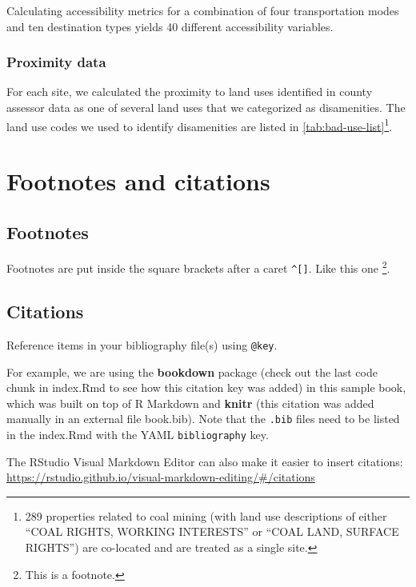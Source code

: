 \documentclass[
]{book}
\theoremstyle{definition}
\theoremstyle{definition}
\theoremstyle{definition}
\theoremstyle{definition}
\theoremstyle{remark}
\begin{document}
Calculating accessibility metrics for a combination of four transportation
modes and ten destination types yields 40 different accessibility variables.

\hypertarget{proximity-data}{%
\subsection{Proximity data}\label{proximity-data}}

For each site, we calculated the proximity to land uses identified in county
assessor data as one of several land uses that we categorized as
disamenities. The land use codes we used to identify disamenities are
listed in \ref{tab:bad-use-list}\footnote{289 properties related to coal mining
  (with land use descriptions of either ``COAL RIGHTS, WORKING INTERESTS'' or
  ``COAL LAND, SURFACE RIGHTS'') are co-located and are treated as a single
  site.}.

\hypertarget{footnotes-and-citations}{%
\chapter{Footnotes and citations}\label{footnotes-and-citations}}

\hypertarget{footnotes}{%
\section{Footnotes}\label{footnotes}}

Footnotes are put inside the square brackets after a caret \texttt{\^{}{[}{]}}. Like this one \footnote{This is a footnote.}.

\hypertarget{citations}{%
\section{Citations}\label{citations}}

Reference items in your bibliography file(s) using \texttt{@key}.

For example, we are using the \textbf{bookdown} package \citep{R-bookdown} (check out the last code chunk in index.Rmd to see how this citation key was added) in this sample book, which was built on top of R Markdown and \textbf{knitr} \citep{xie2015} (this citation was added manually in an external file book.bib).
Note that the \texttt{.bib} files need to be listed in the index.Rmd with the YAML \texttt{bibliography} key.

The RStudio Visual Markdown Editor can also make it easier to insert citations: \url{https://rstudio.github.io/visual-markdown-editing/\#/citations}
\end{document}
